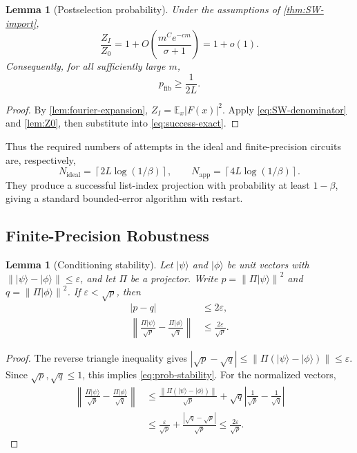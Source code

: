 \documentclass[11pt,letterpaper]{article}
\newtheorem{lemma}[theorem]{Lemma}
\theoremstyle{definition}
\newcommand{\E}{\mathbb{E}}
\newcommand{\ket}[1]{\lvert #1\rangle}
\newcommand{\abs}[1]{\left\lvert #1\right\rvert}
\newcommand{\norm}[1]{\left\lVert #1\right\rVert}
\begin{document}
\begin{lemma}[Postselection probability]
\label{lem:norm-transfer}
Under the assumptions of \cref{thm:SW-import},
\begin{equation}
   \frac{Z_I}{Z_0}=1+O\!\left(\frac{m^Ce^{-cm}}{\sigma+1}\right)=1+o(1).
   \label{eq:norm-ratio}
\end{equation}
Consequently, for all sufficiently large $m$,
\begin{equation}
   p_{\mathrm{fib}}\ge\frac1{2L}.
   \label{eq:success-lower-bound}
\end{equation}
\end{lemma}

\begin{proof}
By \cref{lem:fourier-expansion}, $Z_I=\E_x\abs{F(x)}^2$.  Apply \cref{eq:SW-denominator} and \cref{lem:Z0}, then substitute into \cref{eq:success-exact}.
\end{proof}

Thus the required numbers of attempts in the ideal and finite-precision circuits are, respectively,
\[
   N_{\mathrm{ideal}}=\left\lceil2L\log(1/\beta)\right\rceil,
   \qquad
   N_{\mathrm{app}}=\left\lceil4L\log(1/\beta)\right\rceil.
\]
They produce a successful list-index projection with probability at least $1-\beta$, giving a standard bounded-error algorithm with restart.

\subsection{Finite-Precision Robustness}

\begin{lemma}[Conditioning stability]
\label{lem:conditioning-stability}
Let $\ket\psi$ and $\ket\phi$ be unit vectors with $\norm{\ket\psi-\ket\phi}\le\varepsilon$, and let $\Pi$ be a projector.  Write $p=\norm{\Pi\ket\psi}^2$ and $q=\norm{\Pi\ket\phi}^2$.  If $\varepsilon<\sqrt p$, then
\begin{align}
   \abs{p-q}&\le2\varepsilon,
   \label{eq:prob-stability}\\
   \norm{\frac{\Pi\ket\psi}{\sqrt p}-
          \frac{\Pi\ket\phi}{\sqrt q}}
      &\le\frac{2\varepsilon}{\sqrt p}.
   \label{eq:conditional-stability}
\end{align}
\end{lemma}

\begin{proof}
The reverse triangle inequality gives
$\abs{\sqrt p-\sqrt q}\le\norm{\Pi(\ket\psi-\ket\phi)}\le\varepsilon$.
Since $\sqrt p,\sqrt q\le1$, this implies \cref{eq:prob-stability}.  For the normalized vectors,
\begin{align*}
  \norm{\frac{\Pi\ket\psi}{\sqrt p}-
         \frac{\Pi\ket\phi}{\sqrt q}}
  &\le
    \frac{\norm{\Pi(\ket\psi-\ket\phi)}}{\sqrt p}
    +\sqrt q\abs{\frac1{\sqrt p}-\frac1{\sqrt q}}\\
  &\le\frac{\varepsilon}{\sqrt p}
       +\frac{\abs{\sqrt q-\sqrt p}}{\sqrt p}
   \le\frac{2\varepsilon}{\sqrt p}.
\end{align*}
\end{proof}
\end{document}
